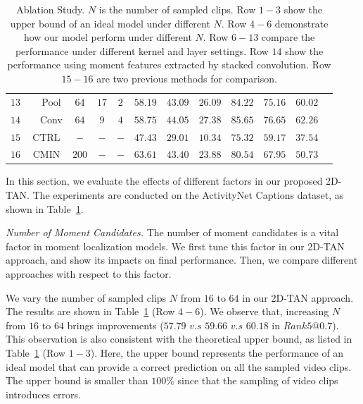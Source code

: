 \documentclass[letterpaper]{article} %
\begin{document}
\begin{table}[t]
\begin{center}
\begin{tabular}{|c|c|c|c|c|c|c|c|c|c|c|c|c|}
			$13$ & & Pool &$64$ & $17$ & $2$ & $58.19$ & $43.09$ & $26.09$ & $84.22$ & $75.16$ & $60.02$ \\
			$14$ & & Conv &$64$ & $9$ & $4$  & $58.75$ & ${44.05}$ & ${27.38}$ & ${85.65}$ & ${76.65}$ & ${62.26}$\\
			\hline
		    \hline
			$15$ & \multicolumn{2}{c|}{CTRL} & $-$ & $-$ & $-$ & $47.43$ & $29.01$ & $10.34$ & $75.32$ & $59.17$ & $37.54$  \\
			$16$ & \multicolumn{2}{c|}{CMIN} & $200$ & $-$ & $-$ & $63.61$ & $43.40$ & $23.88$ & $80.54$ & $67.95$ & $50.73$\\
			\hline
		\end{tabular}
	\end{center}
	\caption{Ablation Study.
	$N$ is the number of sampled clips.
	Row $1-3$ show the upper bound of an ideal model under different $N$.
	Row $4-6$ demonstrate how our model perform under different $N$.
	Row $6-13$ compare the performance under different kernel and layer settings.
	Row $14$ show the performance using moment features  extracted by stacked convolution.
	Row $15-16$ are two previous methods for comparison.
	}
	\label{tab:ablation_study}
\end{table}

In this section, we evaluate the effects of different factors in our proposed 2D-TAN.
The experiments are conducted on the ActivityNet Captions dataset, as shown in Table~\ref{tab:ablation_study}.

\textit{Number of Moment Candidates. } 
The number of moment candidates is a vital factor in moment localization models.
We first tune this factor in our 2D-TAN approach, and show its impacts on final performance. Then, we compare different approaches with respect to this factor.


We vary the number of sampled clips $N$ from $16$ to $64$ in our 2D-TAN approach. The results are shown in Table~\ref{tab:ablation_study} (Row $4-6$). We observe that, increasing $N$ from $16$ to $64$ brings  improvements ($57.79$ $v.s$ $59.66$ $v.s$ $60.18$ in $Rank5@0.7$). This observation is also consistent with the theoretical upper bound, as listed in Table~\ref{tab:ablation_study} (Row $1-3$). Here, the upper bound represents the performance of an ideal model that can provide a correct prediction on all the sampled video clips. The upper bound is smaller than $100\%$ since that the sampling of video clips introduces errors. 
\end{document}
